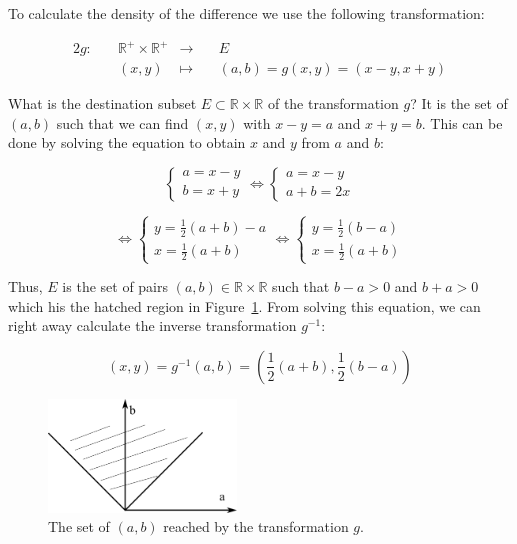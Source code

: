 \documentclass{article}
\newcommand\R{{\mathbb R} }
\begin{document}
To calculate the density of the difference we use the following transformation:

\begin{alignat*}{2}
g:\quad & \R^+ \times \R^+ &\longrightarrow \quad & E \\
& (x,y) & \mapsto\quad & (a,b) = g(x,y) = (x-y, x+y) 
\end{alignat*}

What is the destination subset $E\subset \R \times \R$ of the transformation $g$? It is the set of $(a,b)$ such that we can find $(x,y)$ with $x-y = a$ and $x+y= b$. This can be done by solving the equation to obtain $x$ and $y$ from $a$ and $b$:

\renewcommand\arraystretch{1.2}
$$
\left\{\begin{array}{l} a = x-y\\ b = x+y \end{array}\right. 
\Longleftrightarrow
\left\{\begin{array}{l} a = x-y\\ a+b = 2x\end{array}\right.$$

$$\Longleftrightarrow
\left\{\begin{array}{l} y=\frac{1}{2}(a+b)-a\\ x = \frac{1}{2}(a+b)\end{array}\right. 
\Longleftrightarrow
\left\{\begin{array}{l} y=\frac{1}{2}(b-a)\\ x = \frac{1}{2}(a+b)\end{array}\right. 
$$


Thus, $E$ is the set of pairs $(a,b)\in\R\times\R$  such that $b-a>0$ and $b+a>0$ which his the hatched region in Figure~\ref{fig:TransfoDomain}. From solving this equation, we can right away calculate the inverse transformation $g^{-1}$:

$$(x,y) = g^{-1}(a,b) = \left( \frac{1}{2}(a+b), \frac{1}{2}(b-a) \right)$$


\begin{figure}
\begin{center}
\includegraphics[width=5cm]{./transformation-domain}
\end{center}
\caption{The set of $(a,b)$ reached by the transformation $g$.}\label{fig:TransfoDomain}
\end{figure}
\end{document}
